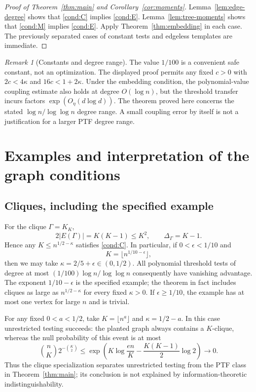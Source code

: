 \documentclass[11pt]{article}
\newcommand{\1}{\mathbf 1}
\theoremstyle{definition}
\theoremstyle{remark}
\newtheorem{remark}[theorem]{Remark}
\numberwithin{equation}{section}
\begin{document}
\begin{proof}[Proof of Theorem~\ref{thm:main} and Corollary~\ref{cor:moments}]
Lemma~\ref{lem:edge-degree} shows that \eqref{cond:C} implies \eqref{cond:E}. Lemma~\ref{lem:tree-moments} shows that \eqref{cond:M} implies \eqref{cond:E}. Apply Theorem~\ref{thm:embedding} in each case. The previously separated cases of constant tests and edgeless templates are immediate.
\end{proof}

\begin{remark}[Constants and degree range]
The value $1/100$ is a convenient safe constant, not an optimization. The displayed proof permits any fixed $c>0$ with $2c<4\kappa$ and $16c<1+2\kappa$. Under the embedding condition, the polynomial-value coupling estimate also holds at degree $O(\log n)$, but the threshold transfer incurs factors $\exp(O_\eta(d\log d))$. The theorem proved here concerns the stated $\log n/\log\log n$ degree range. A small coupling error by itself is not a justification for a larger PTF degree range.
\end{remark}

\section{Examples and interpretation of the graph conditions}

\subsection{Cliques, including the specified example}
For the clique $\Gamma=K_K$,
\[
 2|E(\Gamma)|=K(K-1)\le K^2,
 \qquad \Delta_\Gamma=K-1.
\]
Hence any $K\le n^{1/2-\kappa}$ satisfies \eqref{cond:C}. In particular, if $0<\epsilon<1/10$ and
\[
 K=\lfloor n^{1/10-\epsilon}\rfloor,
\]
then we may take $\kappa=2/5+\epsilon\in(0,1/2)$. All polynomial threshold tests of degree at most $(1/100)\log n/\log\log n$ consequently have vanishing advantage. The exponent $1/10-\epsilon$ is the specified example; the theorem in fact includes cliques as large as $n^{1/2-\kappa}$ for every fixed $\kappa>0$. If $\epsilon\ge1/10$, the example has at most one vertex for large $n$ and is trivial.

For any fixed $0<a<1/2$, take $K=\lfloor n^a\rfloor$ and $\kappa=1/2-a$. In this case unrestricted testing succeeds: the planted graph always contains a $K$-clique, whereas the null probability of this event is at most
\[
 \binom nK 2^{-\binom K2}
 \le \exp\left(K\log\frac{en}{K}-\frac{K(K-1)}2\log2\right)
 \longrightarrow0.
\]
Thus the clique specialization separates unrestricted testing from the PTF class in Theorem~\ref{thm:main}; its conclusion is not explained by information-theoretic indistinguishability.
\end{document}
